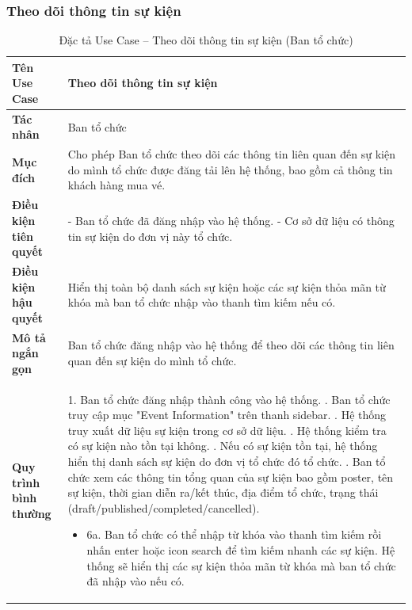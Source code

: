 \subsubsection{Theo dõi thông tin sự kiện}

\renewcommand{\arraystretch}{1.3}
\setlength{\tabcolsep}{8pt}
\begin{longtable}{|p{}|p{}|}
\caption{Đặc tả Use Case -- Theo dõi thông tin sự kiện (Ban tổ chức) }
\label{tab:uc_view_search_event} \\
\hline
\textbf{Tên Use Case} & Theo dõi thông tin sự kiện \\ \hline
\textbf{Tác nhân} & Ban tổ chức \\ \hline
\textbf{Mục đích} & 
Cho phép Ban tổ chức theo dõi các thông tin liên quan đến sự kiện do mình tổ chức được đăng tải lên hệ thống, bao gồm cả thông tin khách hàng mua vé. \\ \hline
\textbf{Điều kiện tiên quyết} & 
- Ban tổ chức đã đăng nhập vào hệ thống. \newline
- Cơ sở dữ liệu có thông tin sự kiện do đơn vị này tổ chức. \\ \hline
\textbf{Điều kiện hậu quyết} & 
Hiển thị toàn bộ danh sách sự kiện hoặc các sự kiện thỏa mãn từ khóa mà ban tổ chức nhập vào thanh tìm kiếm nếu có. \\ \hline
\textbf{Mô tả ngắn gọn} & 
Ban tổ chức đăng nhập vào hệ thống để theo dõi các thông tin liên quan đến sự kiện do mình tổ chức. \\ \hline
\textbf{Quy trình bình thường} &
1. Ban tổ chức đăng nhập thành công vào hệ thống. \newline
2. Ban tổ chức truy cập mục "Event Information" trên thanh sidebar. \newline
3. Hệ thống truy xuất dữ liệu sự kiện trong cơ sở dữ liệu. \newline
4. Hệ thống kiểm tra có sự kiện nào tồn tại không. \newline
5. Nếu có sự kiện tồn tại, hệ thống hiển thị danh sách sự kiện do đơn vị tổ chức đó tổ chức. \newline
6. Ban tổ chức xem các thông tin tổng quan của sự kiện bao gồm poster, tên sự kiện, thời gian diễn ra/kết thúc, địa điểm tổ chức, trạng thái (draft/published/completed/cancelled). \newline
\begin{itemize}
    \item 6a. Ban tổ chức có thể nhập từ khóa vào thanh tìm kiếm rồi nhấn enter hoặc icon search để tìm kiếm nhanh các sự kiện. Hệ thống sẽ hiển thị các sự kiện thỏa mãn từ khóa mà ban tổ chức đã nhập vào nếu có. \newline

\end{itemize}
\end{longtable}
